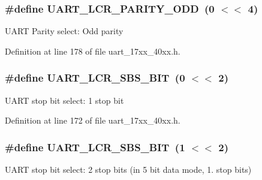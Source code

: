 \subsubsection[{\texorpdfstring{U\+A\+R\+T\+\_\+\+L\+C\+R\+\_\+\+P\+A\+R\+I\+T\+Y\+\_\+\+O\+DD}{UART_LCR_PARITY_ODD}}]{\setlength{\rightskip}{0pt plus 5cm}\#define U\+A\+R\+T\+\_\+\+L\+C\+R\+\_\+\+P\+A\+R\+I\+T\+Y\+\_\+\+O\+DD~(0 $<$$<$ 4)}\hypertarget{group__UART__17XX__40XX_ga5ef9bdb85d3f5c3823d667190b19bb40}{}\label{group__UART__17XX__40XX_ga5ef9bdb85d3f5c3823d667190b19bb40}
U\+A\+RT Parity select\+: Odd parity 

Definition at line 178 of file uart\+\_\+17xx\+\_\+40xx.\+h.

\subsubsection[{\texorpdfstring{U\+A\+R\+T\+\_\+\+L\+C\+R\+\_\+\+S\+B\+S\+\_\+1\+B\+IT}{UART_LCR_SBS_1BIT}}]{\setlength{\rightskip}{0pt plus 5cm}\#define U\+A\+R\+T\+\_\+\+L\+C\+R\+\_\+\+S\+B\+S\+\_\+B\+IT~(0 $<$$<$ 2)}\hypertarget{group__UART__17XX__40XX_ga70ccdedb76a079b8e7c87e5c3709469c}{}\label{group__UART__17XX__40XX_ga70ccdedb76a079b8e7c87e5c3709469c}
U\+A\+RT stop bit select\+: 1 stop bit 

Definition at line 172 of file uart\+\_\+17xx\+\_\+40xx.\+h.

\subsubsection[{\texorpdfstring{U\+A\+R\+T\+\_\+\+L\+C\+R\+\_\+\+S\+B\+S\+\_\+2\+B\+IT}{UART_LCR_SBS_2BIT}}]{\setlength{\rightskip}{0pt plus 5cm}\#define U\+A\+R\+T\+\_\+\+L\+C\+R\+\_\+\+S\+B\+S\+\_\+B\+IT~(1 $<$$<$ 2)}\hypertarget{group__UART__17XX__40XX_ga6d36ad770b49b2354ed5cefbc066b7e2}{}\label{group__UART__17XX__40XX_ga6d36ad770b49b2354ed5cefbc066b7e2}
U\+A\+RT stop bit select\+: 2 stop bits (in 5 bit data mode, 1. stop bits) 

